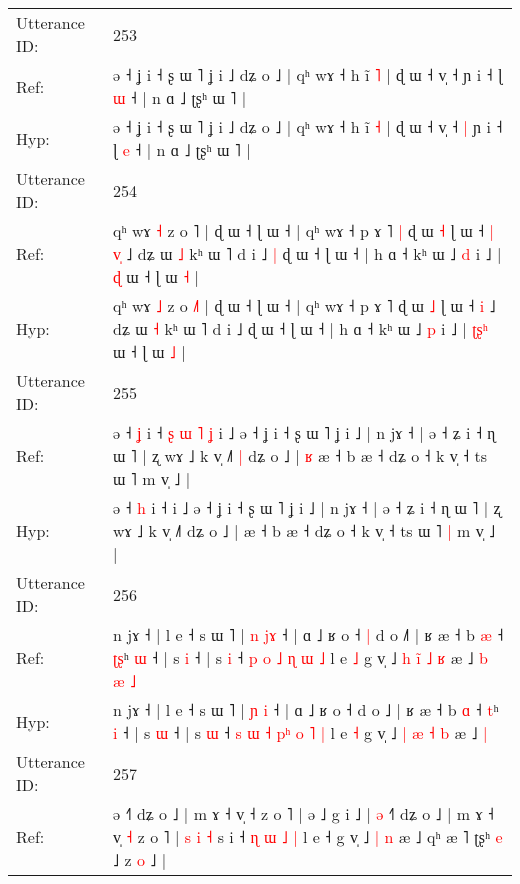 \documentclass[10pt]{article}
\DeclareRobustCommand{\hl}[1]{{\textcolor{red}{#1}}}
\begin{document}
\begin{longtable}{ll}
 \\
\midrule
Utterance ID: & 253 \\
Ref: & ə ˧ ʝ i ˧ ʂ ɯ ˥ ʝ i ˩ dʑ o ˩ | qʰ wɤ ˧ h ĩ \hl{˥} | ɖ ɯ ˧ v̩ ˧\hl{}\hl{} ɲ i ˧ ɭ \hl{ɯ} ˧ | n ɑ ˩ ʈʂʰ ɯ ˥ |
 \\
Hyp: & ə ˧ ʝ i ˧ ʂ ɯ ˥ ʝ i ˩ dʑ o ˩ | qʰ wɤ ˧ h ĩ \hl{˧} | ɖ ɯ ˧ v̩ ˧\hl{ }\hl{|} ɲ i ˧ ɭ \hl{e} ˧ | n ɑ ˩ ʈʂʰ ɯ ˥ |
 \\
\midrule
Utterance ID: & 254 \\
Ref: & qʰ wɤ \hl{˧} z o \hl{}˥ | ɖ ɯ ˧ ɭ ɯ ˧ | qʰ wɤ ˧ p ɤ ˥\hl{ }\hl{|} ɖ ɯ \hl{˧} ɭ ɯ ˧\hl{ }\hl{|} \hl{v}\hl{̩} ˩ dʑ ɯ \hl{˩} kʰ ɯ ˥ d i ˩\hl{ }\hl{|} ɖ ɯ ˧ ɭ ɯ ˧ | h ɑ ˧ kʰ ɯ ˩ \hl{d} i ˩ | \hl{}\hl{}\hl{ɖ} ɯ ˧ ɭ ɯ \hl{˧} |
 \\
Hyp: & qʰ wɤ \hl{˩} z o \hl{˩}˥ | ɖ ɯ ˧ ɭ ɯ ˧ | qʰ wɤ ˧ p ɤ ˥\hl{}\hl{} ɖ ɯ \hl{˩} ɭ ɯ ˧\hl{}\hl{} \hl{}\hl{i} ˩ dʑ ɯ \hl{˧} kʰ ɯ ˥ d i ˩\hl{}\hl{} ɖ ɯ ˧ ɭ ɯ ˧ | h ɑ ˧ kʰ ɯ ˩ \hl{p} i ˩ | \hl{ʈ}\hl{ʂ}\hl{ʰ} ɯ ˧ ɭ ɯ \hl{˩} |
 \\
\midrule
Utterance ID: & 255 \\
Ref: & ə ˧ \hl{ʝ} i ˧\hl{ }\hl{ʂ}\hl{ }\hl{ɯ}\hl{ }\hl{˥}\hl{ }\hl{ʝ} i ˩ ə ˧ ʝ i ˧ ʂ ɯ ˥ ʝ i ˩ | n jɤ ˧ | ə ˧ ʑ i ˧ ɳ ɯ ˥ | ʐ wɤ ˩ k v̩ ˩˥\hl{ }\hl{|} dʑ o ˩ |\hl{ }\hl{ʁ} æ ˧ b æ ˧ dʑ o ˧ k v̩ ˧ ts ɯ ˥\hl{}\hl{} m v̩ ˩ |
 \\
Hyp: & ə ˧ \hl{h} i ˧\hl{}\hl{}\hl{}\hl{}\hl{}\hl{}\hl{}\hl{} i ˩ ə ˧ ʝ i ˧ ʂ ɯ ˥ ʝ i ˩ | n jɤ ˧ | ə ˧ ʑ i ˧ ɳ ɯ ˥ | ʐ wɤ ˩ k v̩ ˩˥\hl{}\hl{} dʑ o ˩ |\hl{}\hl{} æ ˧ b æ ˧ dʑ o ˧ k v̩ ˧ ts ɯ ˥\hl{ }\hl{|} m v̩ ˩ |
 \\
\midrule
Utterance ID: & 256 \\
Ref: & n jɤ ˧ | l e ˧ s ɯ ˥ | \hl{n} \hl{j}\hl{ɤ} ˧ | ɑ ˩ ʁ o ˧\hl{ }\hl{|} d o ˩\hl{˥} | ʁ æ ˧ b \hl{æ} ˧ \hl{ʈ}\hl{ʂ}ʰ \hl{ɯ} ˧ | s \hl{i} ˧ | s \hl{i} ˧\hl{}\hl{} \hl{p} \hl{o} \hl{}\hl{˩} \hl{ɳ} \hl{ɯ} \hl{˩} l e \hl{˩} g v̩ ˩ \hl{h} \hl{i}\hl{̃} \hl{˩} \hl{ʁ} æ ˩\hl{ }\hl{b}\hl{ }\hl{æ} \hl{˩}
 \\
Hyp: & n jɤ ˧ | l e ˧ s ɯ ˥ | \hl{ɲ} \hl{}\hl{i} ˧ | ɑ ˩ ʁ o ˧\hl{}\hl{} d o ˩\hl{} | ʁ æ ˧ b \hl{ɑ} ˧ \hl{}\hl{t}ʰ \hl{i} ˧ | s \hl{ɯ} ˧ | s \hl{ɯ} ˧\hl{ }\hl{s} \hl{ɯ} \hl{˧} \hl{p}\hl{ʰ} \hl{o} \hl{˥} \hl{|} l e \hl{˧} g v̩ ˩ \hl{|} \hl{}\hl{æ} \hl{˧} \hl{b} æ ˩\hl{}\hl{}\hl{}\hl{} \hl{|}
 \\
\midrule
Utterance ID: & 257 \\
Ref: & \hl{}\hl{}\hl{}ə ˧\hl{˥} dʑ o ˩ | m ɤ ˧\hl{}\hl{} v̩ ˧ z o ˥ | ə ˩ g i ˩ | \hl{ə} ˧\hl{˥} dʑ o ˩ | m ɤ ˧\hl{}\hl{} v̩ \hl{˧} z o ˥ |\hl{ }\hl{s}\hl{ }\hl{i}\hl{ }\hl{˧} s i ˧ \hl{ɳ} \hl{ɯ} \hl{˩} \hl{|} l e ˧ g v̩ ˩\hl{}\hl{}\hl{}\hl{} \hl{|} \hl{n} æ ˩ qʰ æ ˥ ʈʂʰ \hl{e} ˩ z \hl{o} ˩ |

\end{longtable}
\end{document}
